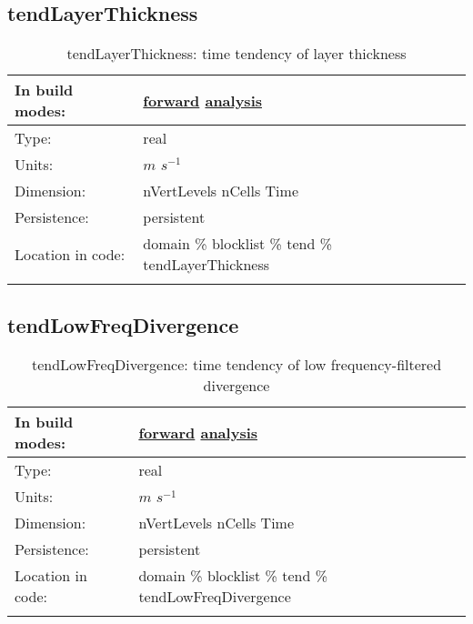 \subsection[tendLayerThickness]{tendLayerThickness}
\label{subsec:var_sec_tend_tendLayerThickness}
\begin{center}
\begin{longtable}{| p{2.0in} | p{4.0in} |}
        \hline 
        In build modes: & \hyperref[subsec:forward_var_tab_tend]{forward} \hyperref[subsec:analysis_var_tab_tend]{analysis} \\
        \hline 
        Type: & real \\
        \hline 
        Units: & $m$ $s^{-1}$ \\
        \hline 
        Dimension: & nVertLevels nCells Time \\
        \hline 
        Persistence: & persistent \\
        \hline 
		 Location in code: & domain \% blocklist \% tend \% tendLayerThickness \\
		 \hline 
    \caption{tendLayerThickness: time tendency of layer thickness}
\end{longtable}
\end{center}
\subsection[tendLowFreqDivergence]{tendLowFreqDivergence}
\label{subsec:var_sec_tend_tendLowFreqDivergence}
\begin{center}
\begin{longtable}{| p{2.0in} | p{4.0in} |}
        \hline 
        In build modes: & \hyperref[subsec:forward_var_tab_tend]{forward} \hyperref[subsec:analysis_var_tab_tend]{analysis} \\
        \hline 
        Type: & real \\
        \hline 
        Units: & $m$ $s^{-1}$ \\
        \hline 
        Dimension: & nVertLevels nCells Time \\
        \hline 
        Persistence: & persistent \\
        \hline 
		 Location in code: & domain \% blocklist \% tend \% tendLowFreqDivergence \\
		 \hline 
    \caption{tendLowFreqDivergence: time tendency of low frequency-filtered divergence}
\end{longtable}
\end{center}
